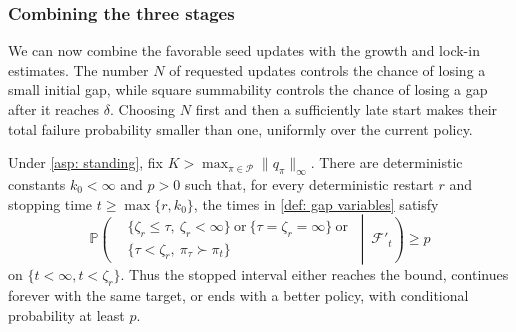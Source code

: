 \subsubsection{Combining the three stages}
We can now combine the favorable seed updates with the growth and lock-in estimates. The number $N$ of requested updates controls the chance of losing a small initial gap, while square summability controls the chance of losing a gap after it reaches $\delta$. Choosing $N$ first and then a sufficiently late start makes their total failure probability smaller than one, uniformly over the current policy.

\begin{lemma}
\label{thm: fixed prob that bad actions dont become greedy}
Under \autoref{asp: standing}, fix $K>\max_{\pi\in\mathcal P}\|q_\pi\|_\infty$. There are deterministic constants $k_0<\infty$ and $p>0$ such that, for every deterministic restart $r$ and stopping time $t\ge\max\{r,k_0\}$, the times in \autoref{def: gap variables} satisfy
\begin{equation}
\label{eq:progress}
\mathbb P\!\left(
\begin{aligned}
&\{\zeta_r\le\tau,\ \zeta_r<\infty\}\ \text{or}\ \{\tau=\zeta_r=\infty\}\ \text{or}\\
&\{\tau<\zeta_r,\ \pi_\tau\succ\pi_t\}
\end{aligned}
\ \middle|\ \mathcal F'_t\right)\ge p
\end{equation}
on $\{t<\infty,t<\zeta_r\}$. Thus the stopped interval either reaches the bound, continues forever with the same target, or ends with a better policy, with conditional probability at least $p$.
\end{lemma}
